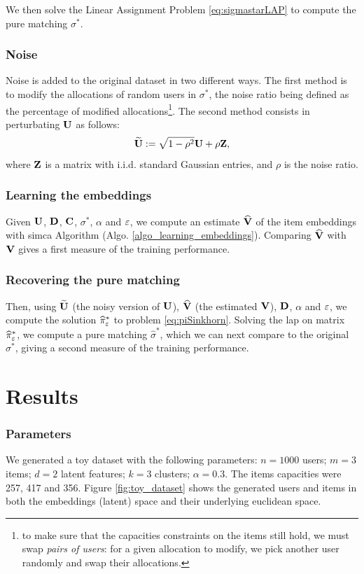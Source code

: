 We then solve the Linear Assignment Problem \eqref{eq:sigmastarLAP} to compute the pure matching $\sigma^*$.

\subsubsection*{Noise}
Noise is added to the original dataset in two different ways. The first method is to modify the allocations of random users in $\sigma^*$, the noise ratio being defined as the percentage of modified allocations\footnote{to make sure that the capacities constraints on the items still hold, we must swap \emph{pairs of users}: for a given allocation to modify, we pick another user randomly and swap their allocations.}. The second method consists in perturbating $\mathbf{U}$ as follows:
\begin{equation*}
    \widetilde{\mathbf{U}} := \sqrt{1-\rho^2} \mathbf{U} + \rho \mathbf{Z},
\end{equation*} where $\mathbf{Z}$ is a matrix with i.i.d. standard Gaussian entries, and $\rho$ is the noise ratio.

\subsubsection*{Learning the embeddings}
Given $\mathbf{U}$, $\mathbf{D}$, $\mathbf{C}$, $\sigma^*$, $\alpha$ and $\varepsilon$, we compute an estimate $\widehat{\mathbf{V}}$ of the item embeddings with \ac{simca} Algorithm (Algo. \ref{algo_learning_embeddings}). Comparing $\widehat{\mathbf{V}}$ with $\mathbf{V}$ gives a first measure of the training performance.

\subsubsection*{Recovering the pure matching}
Then, using $\widetilde{\mathbf{U}}$ (the noisy version of $\mathbf{U}$), $\widehat{\mathbf{V}}$ (the estimated $\mathbf{V}$), $\mathbf{D}$, $\alpha$ and $\varepsilon$, we compute the solution $\widehat{\pi}^*_{\varepsilon}$ to problem \eqref{eq:piSinkhorn}. Solving the \ac{lap} on matrix $\widehat{\pi}^*_{\varepsilon}$, we compute a pure matching $\widehat{\sigma}^*$, which we can next compare to the original ${\sigma}^*$, giving a second measure of the training performance.

\section{Results}

\subsubsection*{Parameters}
We generated a toy dataset with the following parameters: $n=1000$ users; $m=3$ items; $d=2$ latent features; $k=3$ clusters; $\alpha=0.3$. The items capacities were 257, 417 and 356. Figure \ref{fig:toy_dataset} shows the generated users and items in both the embeddings (latent) space and their underlying euclidean space.

